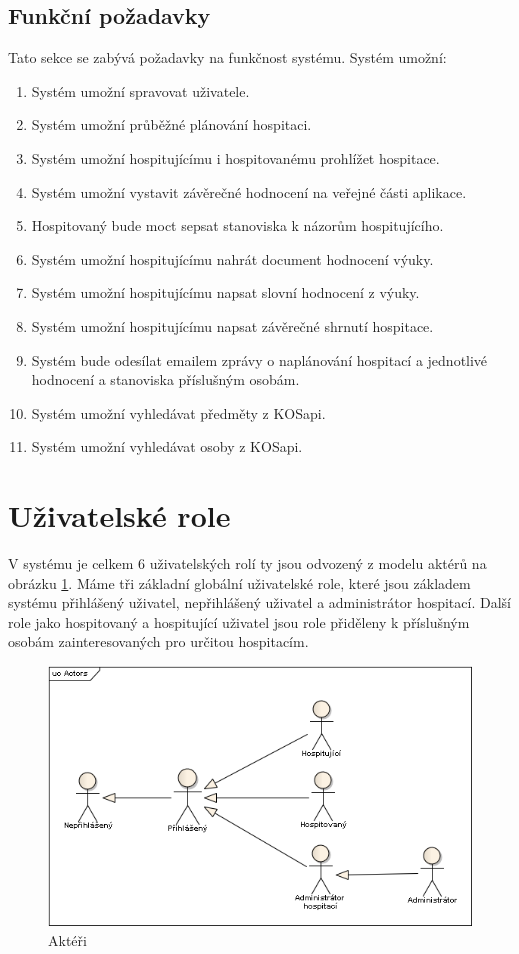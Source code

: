 \subsection{Funkční požadavky}
Tato sekce se zabývá požadavky na funkčnost systému. Systém umožní:
\begin{enumerate}
\item Systém umožní spravovat uživatele.
\item Systém umožní průběžné plánování hospitaci.
\item Systém umožní hospitujícímu i hospitovanému prohlížet hospitace.
\item Systém umožní vystavit závěrečné hodnocení na veřejné části aplikace. 
\item Hospitovaný bude moct sepsat stanoviska k názorům hospitujícího.
\item Systém umožní hospitujícímu nahrát document hodnocení výuky.
\item Systém umožní hospitujícímu napsat slovní hodnocení z výuky.
\item Systém umožní hospitujícímu napsat závěrečné shrnutí hospitace.
\item Systém bude odesílat emailem zprávy o naplánování hospitací a jednotlivé hodnocení a stanoviska příslušným osobám.
\item Systém umožní vyhledávat předměty z KOSapi.
\item Systém umožní vyhledávat osoby z KOSapi.
\end{enumerate}

\section{Uživatelské role}
V systému je celkem 6 uživatelských rolí ty jsou odvozený z modelu aktérů na obrázku \ref{fig:actors}. Máme tři základní globální uživatelské role, které jsou základem systému přihlášený uživatel, nepřihlášený uživatel a administrátor hospitací. Další role jako hospitovaný a hospitující uživatel jsou role přiděleny k příslušným osobám zainteresovaných pro určitou hospitacím.

\begin{figure}[h]
\begin{center}
\includegraphics[width=16cm]{figures/Actors}
\caption{Aktéři}
\label{fig:actors}
\end{center}
\end{figure}

